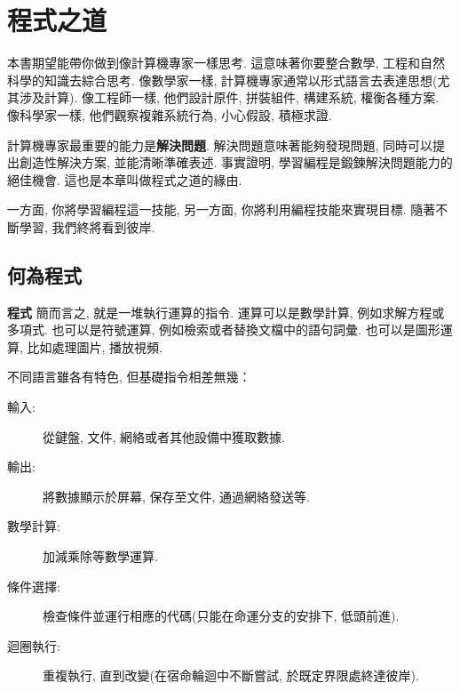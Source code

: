 \documentclass[10pt]{book}
\begin{document}
\begin{latexonly}

\tableofcontents

\clearemptydoublepage

\end{latexonly}

\mainmatter

\chapter{程式之道}

本書期望能帶你做到像計算機專家一樣思考. 
這意味著你要整合數學, 工程和自然科學的知識去綜合思考. 
像數學家一樣, 計算機專家通常以形式語言去表達思想(尤其涉及計算). 
像工程師一樣, 他們設計原件, 拼裝組件, 構建系統, 權衡各種方案. 
像科學家一樣, 他們觀察複雜系統行為, 小心假設, 積極求證. 

計算機專家最重要的能力是{\bf 解決問題}. 
解決問題意味著能夠發現問題, 同時可以提出創造性解決方案, 並能清晰準確表述. 
事實證明, 學習編程是鍛鍊解決問題能力的絕佳機會. 
這也是本章叫做程式之道的緣由. 
 
一方面, 你將學習編程這一技能, 另一方面, 你將利用編程技能來實現目標. 
隨著不斷學習, 我們終將看到彼岸. 

\section{何為程式}

{\bf 程式} 簡而言之, 就是一堆執行運算的指令. 
運算可以是數學計算, 例如求解方程或多項式. 
也可以是符號運算, 例如檢索或者替換文檔中的語句詞彙. 
也可以是圖形運算, 比如處理圖片, 播放視頻. 

不同語言雖各有特色, 但基礎指令相差無幾：

\begin{description}

\item[輸入:] 從鍵盤, 文件, 網絡或者其他設備中獲取數據. 

\item[輸出:] 將數據顯示於屏幕, 保存至文件, 通過網絡發送等. 

\item[數學計算:] 加減乘除等數學運算. 

\item[條件選擇:] 檢查條件並運行相應的代碼(只能在命運分支的安排下, 低頭前進). 

\item[迴圈執行:] 重複執行, 直到改變(在宿命輪迴中不斷嘗試, 於既定界限處終達彼岸). 

\end{description}
\end{document}

